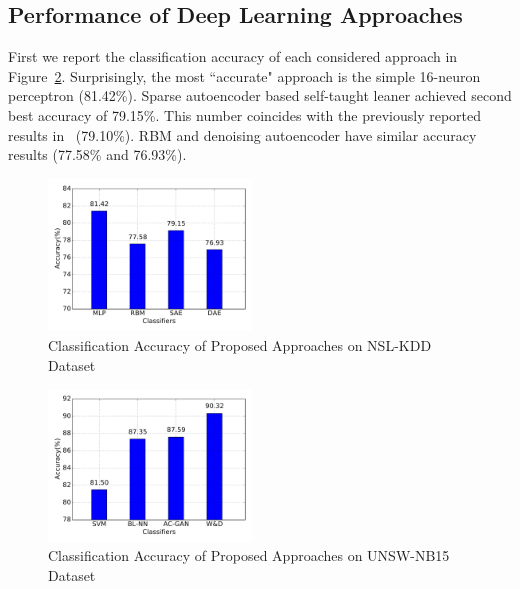 \subsection{Performance of Deep Learning Approaches}
First we report the classification accuracy of each considered approach in Figure~\ref{Fig:CompAccuracy}.
Surprisingly, the most ``accurate" approach is the simple 16-neuron perceptron (81.42\%).
Sparse autoencoder based self-taught leaner achieved second best accuracy of 79.15\%.
This number coincides with the previously reported results in~\cite{STL-NIDS} (79.10\%).
RBM and denoising autoencoder have similar accuracy results (77.58\% and 76.93\%).

\begin{figure}[h]
    \centering
    \includegraphics[width=0.48\textwidth]{figures/comp_accuracy.pdf}
    \caption{Classification Accuracy of Proposed Approaches on NSL-KDD Dataset}
    \label{Fig:CompAccuracy}
\end{figure}

\begin{figure}[h]
    \centering
    \includegraphics[width=0.48\textwidth]{figures/comp_accuracy_unsw.pdf}
    \caption{Classification Accuracy of Proposed Approaches on UNSW-NB15 Dataset}
    \label{Fig:CompAccuracy}
\end{figure}

